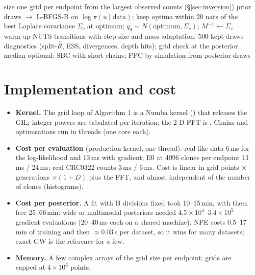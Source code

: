 \documentclass[11pt]{article}
\theoremstyle{definition}
\theoremstyle{remark}
\newcommand{\code}[1]{\texttt{\detokenize{#1}}}
\begin{document}
\begin{algorithm}[H]
\caption{\code{exact_gw} for one dataset}
\begin{algorithmic}[1]
\State size one grid per endpoint from the largest observed counts (\S\ref{sec:inversion})
 prior draws $\to$ L-BFGS-B on $\log\pi(u\mid\text{data})$; keep optima within 20 nats of the best
  \State Laplace covariance $\Sigma_c$ at optimum; $q_0\sim N(\text{optimum},\Sigma_c)$; $M^{-1}\gets\Sigma_c$
   warm-up NUTS transitions with step-size and mass adaptation; 500 kept draws
\EndFor
\State diagnostics (split-$\hat R$, ESS, divergences, depth hits); grid check at the posterior median
\State optional: SBC with short chains; PPC by simulation from posterior draws
\end{algorithmic}
\end{algorithm}

\section{Implementation and cost}\label{sec:impl}
\begin{itemize}
\item \textbf{Kernel.} The grid loop of Algorithm 1 is a Numba kernel (\code{_pgf_grid}) that releases the GIL; integer powers are tabulated per iteration; the 2-D FFT is \code{scipy.fft.irfft2}. Chains and optimisations run in threads (one core each).
\item \textbf{Cost per evaluation} (production kernel, one thread): real-like data 6\,ms for the log-likelihood and 13\,ms with gradient; E0 at 4096 clones per endpoint 11\,ms / 24\,ms; real CRC0322 counts 3\,ms / 6\,ms. Cost is linear in grid points $\times$ generations $\times(1+D)$ plus the FFT, and almost independent of the number of clones (histograms).
\item \textbf{Cost per posterior.} A fit with B divisions fixed took 10--15\,min, with them free 25--66\,min: wide or multimodal posteriors needed $4.5\times10^4$--$3.4\times10^5$ gradient evaluations (20--40\,ms each on a shared machine). NPE costs 0.5--17\,min of training and then $\approx0.03$\,s per dataset, so it wins for many datasets; exact GW is the reference for a few.
\item \textbf{Memory.} A few complex arrays of the grid size per endpoint; grids are capped at $4\times10^6$ points.
\end{itemize}
\end{document}
